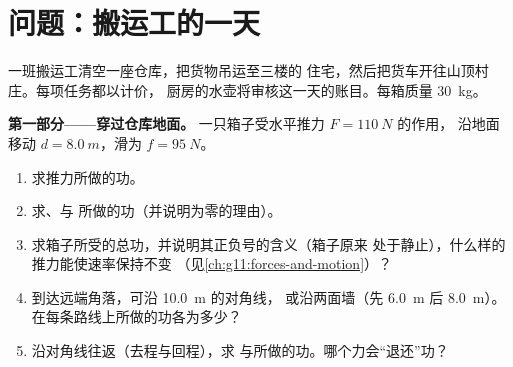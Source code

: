 \section{问题：搬运工的一天}

\begin{problem}
\label{pb:g11:work-of-force:1}
一班搬运工清空一座仓库，把货物吊运至三楼的
住宅，然后把货车开往山顶村庄。每项任务都以计价，
厨房的水壶将审核这一天的账目。每箱质量 \qty{30}{kg}。

\medskip
\noindent\textbf{第一部分——穿过仓库地面。}
一只箱子受水平推力 $F = \qty{110}{N}$ 的作用，
沿地面移动 $d = \qty{8.0}{m}$，滑为 $f = \qty{95}{N}$。
\begin{enumerate}
  \item 求推力所做的功。
  \item 求、与
        所做的功（并说明为零的理由）。
  \item 求箱子所受的总功，并说明其正负号的含义（箱子原来
        处于静止），什么样的推力能使速率保持不变
        （见\cref{ch:g11:forces-and-motion}）？
  \item 到达远端角落，可沿 \qty{10.0}{m} 的对角线，
        或沿两面墙（先 \qty{6.0}{m} 后 \qty{8.0}{m}）。
        在每条路线上所做的功各为多少？
  \item 沿对角线往返（去程与回程），求
        与所做的功。哪个力会“退还”功？
\end{enumerate}


\end{problem}
